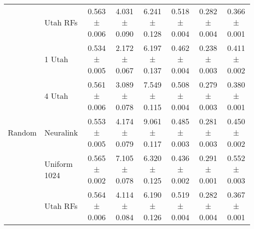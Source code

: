 \begin{table}
\begin{tabular}{llcccccc}
 & Utah RFs & 0.563 ± 0.006 & 4.031 ± 0.090 & 6.241 ± 0.128 & 0.518 ± 0.004 & 0.282 ± 0.004 & 0.366 ± 0.001 \\
\cline{1-8}
\multirow[t]{5}{*}{Random} & 1 Utah & 0.534 ± 0.005 & 2.172 ± 0.067 & 6.197 ± 0.137 & 0.462 ± 0.004 & 0.238 ± 0.003 & 0.411 ± 0.002 \\
 & 4 Utah & 0.561 ± 0.006 & 3.089 ± 0.078 & 7.549 ± 0.115 & 0.508 ± 0.004 & 0.279 ± 0.003 & 0.380 ± 0.001 \\
 & Neuralink & 0.553 ± 0.005 & 4.174 ± 0.079 & 9.061 ± 0.117 & 0.485 ± 0.003 & 0.281 ± 0.003 & 0.450 ± 0.002 \\
 & Uniform 1024 & 0.565 ± 0.002 & 7.105 ± 0.078 & 6.320 ± 0.125 & 0.436 ± 0.002 & 0.291 ± 0.001 & 0.552 ± 0.003 \\
 & Utah RFs & 0.564 ± 0.006 & 4.114 ± 0.084 & 6.190 ± 0.126 & 0.519 ± 0.004 & 0.282 ± 0.004 & 0.367 ± 0.001 \\
\cline{1-8}
\bottomrule
\end{tabular}
\end{table}
